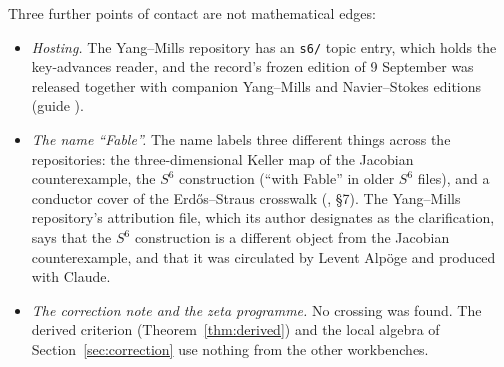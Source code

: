 Three further points of contact are not mathematical edges:
\begin{itemize}
\item \emph{Hosting.} The Yang--Mills repository has an \texttt{s6/} topic entry, which holds the key-advances reader, and the record's frozen edition of 9 September was released together with companion Yang--Mills and Navier--Stokes editions (guide ).
\item \emph{The name ``Fable''.} The name labels three different things across the repositories: the three-dimensional Keller map of the Jacobian counterexample, the $S^6$ construction (``with Fable'' in older $S^6$ files), and a conductor cover of the Erdős--Straus crosswalk (\cite{ESReader}, §7). The Yang--Mills repository's attribution file, which its author designates as the clarification, says that the $S^6$ construction is a different object from the Jacobian counterexample, and that it was circulated by Levent Alpöge and produced with Claude.
\item \emph{The correction note and the zeta programme.} No crossing was found. The derived criterion (Theorem~\ref{thm:derived}) and the local algebra of Section~\ref{sec:correction} use nothing from the other workbenches.
\end{itemize}
